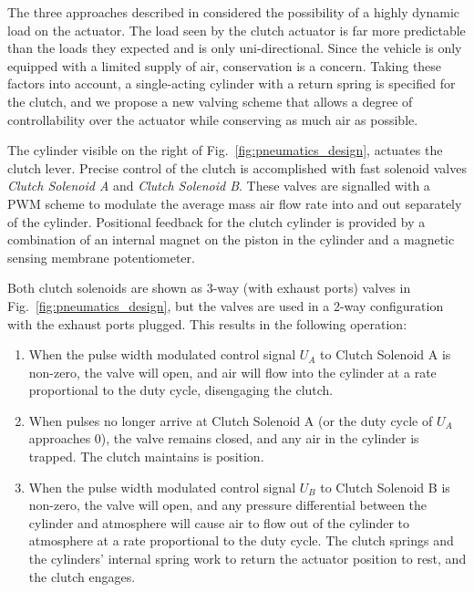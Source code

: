 The three approaches described in \cite{pneumatic_actuator, adaptive_pneumatic, accurate_position} considered the possibility of a highly dynamic load on the actuator. The load seen by the clutch actuator is far more predictable than the loads they expected and is only uni-directional. Since the vehicle is only equipped with a limited supply of air, conservation is a concern. Taking these factors into account, a single-acting cylinder with a return spring is specified for the clutch, and we propose a new valving scheme that allows a degree of controllability over the actuator while conserving as much air as possible.

The cylinder visible on the right of Fig.\ \ref{fig:pneumatics_design}, actuates the clutch lever. Precise control of the clutch is accomplished with fast solenoid valves \emph{Clutch Solenoid A} and \emph{Clutch Solenoid B}. These valves are signalled with a PWM scheme to modulate the average mass air flow rate into and out separately of the cylinder. Positional feedback for the clutch cylinder is provided by a combination of an internal magnet on the piston in the cylinder and a magnetic sensing membrane potentiometer.

Both clutch solenoids are shown as 3-way (with exhaust ports) valves in Fig.\ \ref{fig:pneumatics_design}, but the valves are used in a 2-way configuration with the exhaust ports plugged.  This results in the following operation:

\begin{enumerate}
  \item When the pulse width modulated control signal $U_A$ to Clutch Solenoid A is non-zero, the valve will open, and air will flow into the cylinder at a rate proportional to the duty cycle, disengaging the clutch.
  \item When pulses no longer arrive at Clutch Solenoid A (or the duty cycle of $U_A$ approaches 0), the valve remains closed, and any air in the cylinder is trapped. The clutch maintains is position.
  \item When the pulse width modulated control signal $U_B$ to Clutch Solenoid B is non-zero, the valve will open, and any pressure differential between the cylinder and atmosphere will cause air to flow out of the cylinder to atmosphere at a rate proportional to the duty cycle. The clutch springs and the cylinders' internal spring work to return the actuator position to rest, and the clutch engages.
\end{enumerate}


